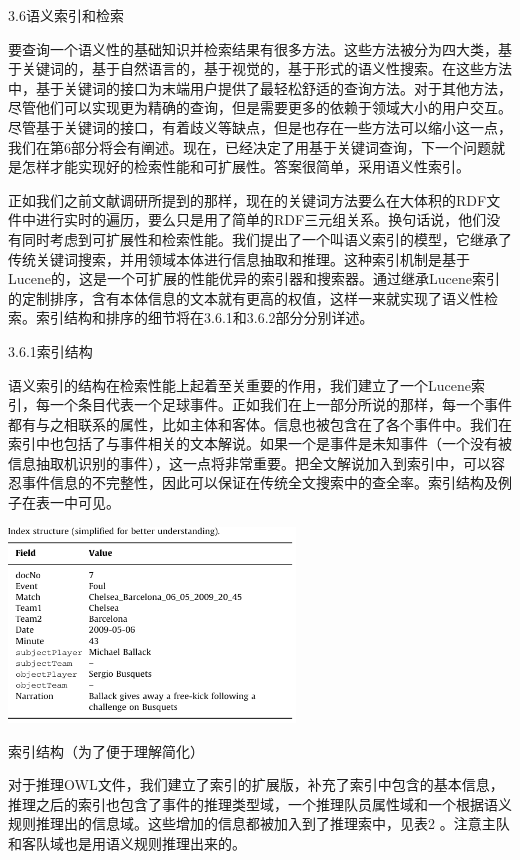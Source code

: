 3.6语义索引和检索

要查询一个语义性的基础知识并检索结果有很多方法。这些方法被分为四大类，基于关键词的，基于自然语言的，基于视觉的，基于形式的语义性搜索。在这些方法中，基于关键词的接口为末端用户提供了最轻松舒适的查询方法。对于其他方法，尽管他们可以实现更为精确的查询，但是需要更多的依赖于领域大小的用户交互。尽管基于关键词的接口，有着歧义等缺点，但是也存在一些方法可以缩小这一点，我们在第6部分将会有阐述。现在，已经决定了用基于关键词查询，下一个问题就是怎样才能实现好的检索性能和可扩展性。答案很简单，采用语义性索引。

正如我们之前文献调研所提到的那样，现在的关键词方法要么在大体积的{\Times RDF}文件中进行实时的遍历，要么只是用了简单的{\Times RDF}三元组关系。换句话说，他们没有同时考虑到可扩展性和检索性能。我们提出了一个叫语义索引的模型，它继承了传统关键词搜索，并用领域本体进行信息抽取和推理。这种索引机制是基于{\Times Lucene}的，这是一个可扩展的性能优异的索引器和搜索器。通过继承{\Times Lucene}索引的定制排序，含有本体信息的文本就有更高的权值，这样一来就实现了语义性检索。索引结构和排序的细节将在3.6.1和3.6.2部分分别详述。

3.6.1索引结构

语义索引的结构在检索性能上起着至关重要的作用，我们建立了一个{\Times Lucene}索引，每一个条目代表一个足球事件。正如我们在上一部分所说的那样，每一个事件都有与之相联系的属性，比如主体和客体。信息也被包含在了各个事件中。我们在索引中也包括了与事件相关的文本解说。如果一个是事件是未知事件（一个没有被信息抽取机识别的事件），这一点将非常重要。把全文解说加入到索引中，可以容忍事件信息的不完整性，因此可以保证在传统全文搜索中的查全率。索引结构及例子在表一中可见。


	\begin{table}[htbp] 
	\centering\includegraphics[width=3in]{fig/trans/tab1.png} 
	\caption[]{索引结构（为了便于理解简化）}
	\end{table} 

对于推理{\Times OWL}文件，我们建立了索引的扩展版，补充了索引中包含的基本信息，推理之后的索引也包含了事件的推理类型域，一个推理队员属性域和一个根据语义规则推理出的信息域。这些增加的信息都被加入到了推理索中，见表2 。注意主队和客队域也是用语义规则推理出来的。

